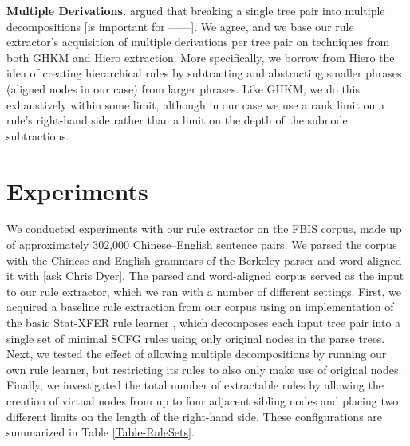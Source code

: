 \documentclass[11pt]{article}
\begin{document}
{\bf Multiple Derivations.}   argued that breaking a single tree pair into multiple decompositions [is important for ------].  We agree, and we base our rule extractor's acquisition of multiple derivations per tree pair on techniques from both GHKM and Hiero extraction.  More specifically, we borrow from Hiero the idea of creating hierarchical rules by subtracting and abstracting smaller phrases (aligned nodes in our case) from larger phrases.  Like GHKM, we do this exhaustively within some limit, although in our case we use a rank limit on a rule's right-hand side rather than a limit on the depth of the subnode subtractions.


\section{Experiments}

We conducted experiments with our rule extractor on the FBIS corpus, made up of approximately 302,000 Chinese--English sentence pairs.  We parsed the corpus with the Chinese and English grammars of the Berkeley parser \cite{Berkeley-Parser} and word-aligned it with [ask Chris Dyer].  The parsed and word-aligned corpus served as the input to our rule extractor, which we ran with a number of different settings.  First, we acquired a baseline rule extraction from our corpus using an implementation of the basic Stat-XFER rule learner \cite{Lavie-SSST}, which decomposes each input tree pair into a single set of minimal SCFG rules using only original nodes in the parse trees.  Next, we tested the effect of allowing multiple decompositions by running our own rule learner, but restricting its rules to also only make use of original nodes.  Finally, we investigated the total number of extractable rules by allowing the creation of virtual nodes from up to four adjacent sibling nodes and placing two different limits on the length of the right-hand side.  These configurations are summarized in Table \ref{Table-RuleSets}.
\end{document}
